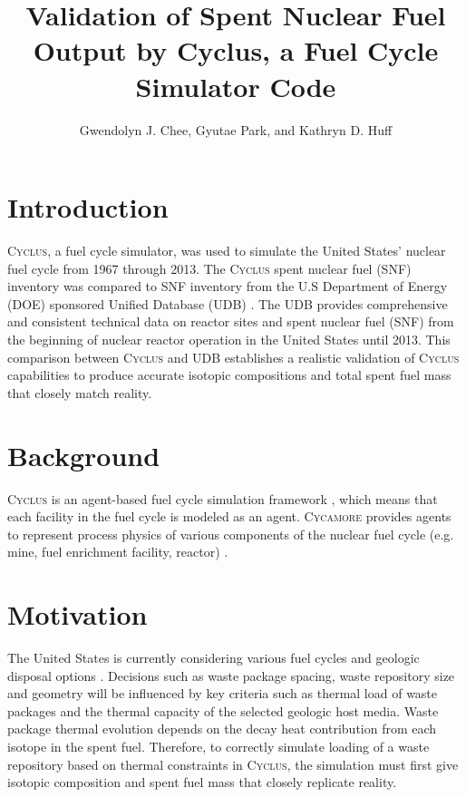 \documentclass{anstrans}
\title{Validation of Spent Nuclear Fuel Output by Cyclus, a Fuel Cycle Simulator Code}
\author{Gwendolyn J. Chee, Gyutae Park, and Kathryn D. Huff}
\institute{
Dept. of Nuclear, Plasma and Radiological Engineering, University of Illinois at Urbana-Champaign \\
gchee2@illinois.edu
}
\newcommand{\Cyclus}{\textsc{Cyclus}\xspace}%
\newcommand{\Cycamore}{\textsc{Cycamore}\xspace}%
\begin{document}
\section{Introduction}
\Cyclus \cite{carlsen_cyclus_2014}, a fuel cycle simulator, was used to simulate the
United States' nuclear fuel cycle from 1967 through 2013. The \Cyclus spent nuclear fuel (SNF) inventory was compared to SNF inventory from the U.S Department of Energy (DOE) sponsored Unified Database (UDB) \cite{peterson_unf-st&dards_2017}. The UDB provides comprehensive and consistent technical data on reactor sites and spent nuclear fuel (SNF) from the beginning of nuclear reactor operation in the United States until 2013. This comparison between \Cyclus and UDB establishes a realistic validation of \Cyclus capabilities to produce accurate isotopic compositions and total spent fuel mass that closely match reality. 

\section{Background}
\Cyclus is an agent-based fuel cycle simulation framework \cite{huff_fundamental_2016}, which means that each facility in the fuel cycle is modeled as an agent. \Cycamore \cite{carlsen_cycamore_2014} provides agents to represent process physics of various components of the nuclear fuel cycle (e.g. mine, fuel enrichment facility, reactor) \cite{huff_extensions_2014}. 

\section{Motivation}
The United States is currently considering various fuel cycles and geologic disposal options
\cite{DOE_strategy_2013}. Decisions such as waste package spacing, waste repository size and geometry will be influenced by key criteria such as thermal load of waste packages and the thermal capacity of the selected geologic host media. Waste package thermal evolution depends on the decay heat contribution from each isotope in the spent fuel. Therefore, to correctly simulate loading of a waste repository based on thermal constraints in \Cyclus, the simulation must first give isotopic composition and spent fuel mass that closely replicate reality. 

\end{document}
